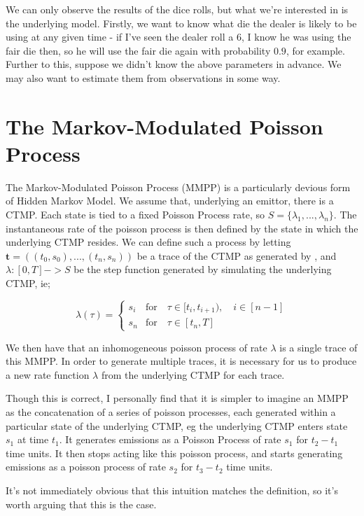 We can only observe the results of the dice rolls, but what we're interested in is the underlying model. Firstly, we want to know what die the dealer is likely to be using at any given time - if I've seen the dealer roll a 6, I know he was using the fair die then, so he will use the fair die again with probability $0.9$, for example. Further to this, suppose we didn't know the above parameters in advance. We may also want to estimate them from observations in some way.

\section{The Markov-Modulated Poisson Process}

The Markov-Modulated Poisson Process (MMPP) is a particularly devious form of Hidden Markov Model. We assume that, underlying an emittor, there is a CTMP. Each state is tied to a fixed Poisson Process rate, so $S = \{\lambda_1,...,\lambda_n\}$. The instantaneous rate of the poisson process is then defined by the state in which the underlying CTMP resides. We can define such a process by letting $\mathbf{t} = ((t_0,s_0),...,(t_n,s_n))$ be a trace of the CTMP as generated by %
, and $\lambda : [0,T]->S$ be the step function generated by simulating the underlying CTMP, ie;

$$
\lambda(\tau) = 
\begin{cases}
	s_i & \mbox{for} \quad \tau \in [t_i,t_{i+1}), \quad i \in [n-1]\\
	s_n & \mbox{for} \quad \tau \in [t_n,T]
\end{cases}
$$

We then have that an inhomogeneous poisson process of rate $\lambda$ is a single trace of this MMPP. In order to generate multiple traces, it is necessary for us to produce a new rate function $\lambda$ from the underlying CTMP for each trace.

Though this is correct, I personally find that it is simpler to imagine an MMPP as the concatenation of a series of poisson processes, each generated within a particular state of the underlying CTMP, eg the underlying CTMP enters state $s_1$ at time $t_1$. It generates emissions as a Poisson Process of rate $s_1$ for $t_2-t_1$ time units. It then stops acting like this poisson process, and starts generating emissions as a poisson process of rate $s_2$ for $t_3-t_2$ time units.

It's not immediately obvious that this intuition matches the definition, so it's worth arguing that this is the case.


